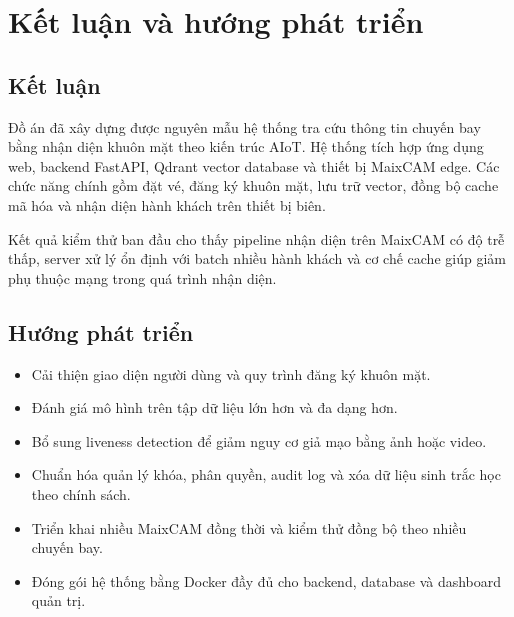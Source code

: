 \section{Kết luận và hướng phát triển}

\subsection{Kết luận}
Đồ án đã xây dựng được nguyên mẫu hệ thống tra cứu thông tin chuyến bay bằng nhận diện khuôn mặt theo kiến trúc AIoT. Hệ thống tích hợp ứng dụng web, backend FastAPI, Qdrant vector database và thiết bị MaixCAM edge. Các chức năng chính gồm đặt vé, đăng ký khuôn mặt, lưu trữ vector, đồng bộ cache mã hóa và nhận diện hành khách trên thiết bị biên.

Kết quả kiểm thử ban đầu cho thấy pipeline nhận diện trên MaixCAM có độ trễ thấp, server xử lý ổn định với batch nhiều hành khách và cơ chế cache giúp giảm phụ thuộc mạng trong quá trình nhận diện.

\subsection{Hướng phát triển}
\begin{itemize}
  \item Cải thiện giao diện người dùng và quy trình đăng ký khuôn mặt.
  \item Đánh giá mô hình trên tập dữ liệu lớn hơn và đa dạng hơn.
  \item Bổ sung liveness detection để giảm nguy cơ giả mạo bằng ảnh hoặc video.
  \item Chuẩn hóa quản lý khóa, phân quyền, audit log và xóa dữ liệu sinh trắc học theo chính sách.
  \item Triển khai nhiều MaixCAM đồng thời và kiểm thử đồng bộ theo nhiều chuyến bay.
  \item Đóng gói hệ thống bằng Docker đầy đủ cho backend, database và dashboard quản trị.
\end{itemize}

